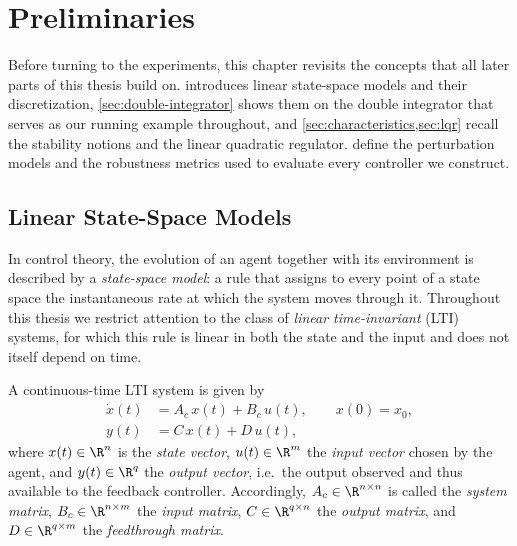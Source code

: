 \chapter{Preliminaries}
\label{chap:preliminaries}
 
Before turning to the experiments, this chapter revisits the concepts that all
later parts of this thesis build on.  introduces linear
state-space models and their discretization, \cref{sec:double-integrator}
shows them on the double integrator that serves as our running example
throughout, and \cref{sec:characteristics,sec:lqr} recall the stability notions and
the linear quadratic regulator.  define the
perturbation models and the robustness metrics used to evaluate every
controller we construct.

\section{Linear State-Space Models}
\label{sec:state-space}
 
In control theory, the evolution of an agent together with its environment is
described by a \emph{state-space model}: a rule that assigns to every point of
a state space the instantaneous rate at which the system moves through it.
Throughout this thesis we restrict attention to the class of
\emph{linear time-invariant} (LTI) systems, for which this rule is linear in
both the state and the input and does not itself depend on
time.
 
A continuous-time LTI system is given by
\begin{subequations}
\label{eq:ss-cont}
\begin{align}
    \dot{x}(t) &= A_c\, x(t) + B_c\, u(t), \qquad x(0) = x_0, \label{eq:ss-cont-state}\\
    y(t)       &= C\, x(t) + D\, u(t), \label{eq:ss-cont-output}
\end{align}
\end{subequations}
where $x(t) \in \R^{n}$ is the \emph{state vector}, $u(t) \in \R^{m}$ the
\emph{input vector} chosen by the agent, and $y(t) \in \R^{q}$ the
\emph{output vector}, i.e.\ the output observed and thus available to the
feedback controller. Accordingly, $A_c \in \R^{n \times n}$ is called the
\emph{system matrix}, $B_c \in \R^{n \times m}$ the \emph{input matrix},
$C \in \R^{q \times n}$ the \emph{output matrix}, and $D \in \R^{q \times m}$
the \emph{feedthrough matrix}.
 

